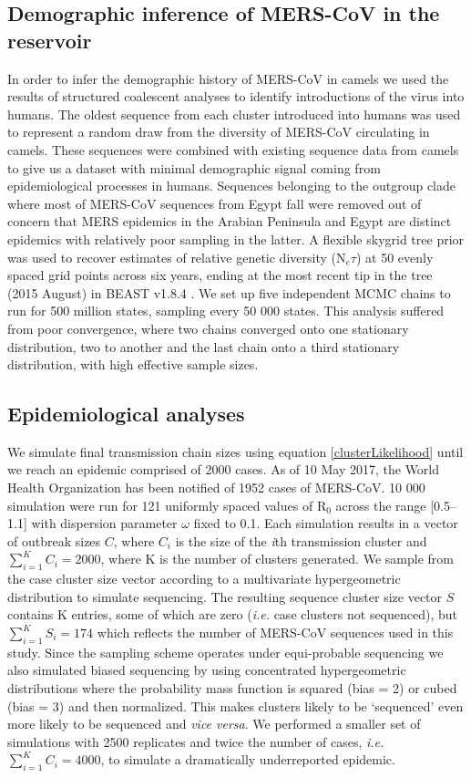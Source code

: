 \documentclass[11pt,oneside,letterpaper]{article}
\begin{document}
\subsection*{Demographic inference of MERS-CoV in the reservoir}
In order to infer the demographic history of MERS-CoV in camels we used the results of structured coalescent analyses to identify introductions of the virus into humans.
The oldest sequence from each cluster introduced into humans was used to represent a random draw from the diversity of MERS-CoV circulating in camels.
These sequences were combined with existing sequence data from camels to give us a dataset with minimal demographic signal coming from epidemiological processes in humans.
Sequences belonging to the outgroup clade where most of MERS-CoV sequences from Egypt fall were removed out of concern that MERS epidemics in the Arabian Peninsula and Egypt are distinct epidemics with relatively poor sampling in the latter.
A flexible skygrid tree prior \citep{gill_2013} was used to recover estimates of relative genetic diversity (N$_{e}\tau$) at 50 evenly spaced grid points across six years, ending at the most recent tip in the tree (2015 August) in BEAST v1.8.4 \citep{drummond_bayesian_2012}.
We set up five independent MCMC chains to run for 500 million states, sampling every 50 000 states.
This analysis suffered from poor convergence, where two chains converged onto one stationary distribution, two to another and the last chain onto a third stationary distribution, with high effective sample sizes.

\subsection*{Epidemiological analyses}
We simulate final transmission chain sizes using equation \ref{clusterLikelihood} \citep{lloyd-smith_superspreading_2005,blumberg_inference_2013} until we reach an epidemic comprised of 2000 cases.
As of 10 May 2017, the World Health Organization has been notified of 1952 cases of MERS-CoV.
10 000 simulation were run for 121 uniformly spaced values of R$_{0}$ across the range [0.5--1.1] with dispersion parameter $\omega$ fixed to 0.1.
Each simulation results in a vector of outbreak sizes $C$, where $C_{i}$ is the size of the \textit{i}th transmission cluster and $\sum_{i=1}^{K} C_{i} = 2000$, where K is the number of clusters generated.
We sample from the case cluster size vector according to a multivariate hypergeometric distribution to simulate sequencing.
The resulting sequence cluster size vector $S$ contains K entries, some of which are zero (\textit{i.e.} case clusters not sequenced), but $\sum_{i=1}^{K} S_{i} = 174$ which reflects the number of MERS-CoV sequences used in this study.
Since the sampling scheme operates under equi-probable sequencing we also simulated biased sequencing by using concentrated hypergeometric distributions where the probability mass function is squared (bias = 2) or cubed (bias = 3) and then normalized.
This makes clusters likely to be `sequenced' even more likely to be sequenced and \textit{vice versa}.
We performed a smaller set of simulations with 2500 replicates and twice the number of cases, \textit{i.e.} $\sum_{i=1}^{K} C_{i} = 4000$, to simulate a dramatically underreported epidemic.
\end{document}
